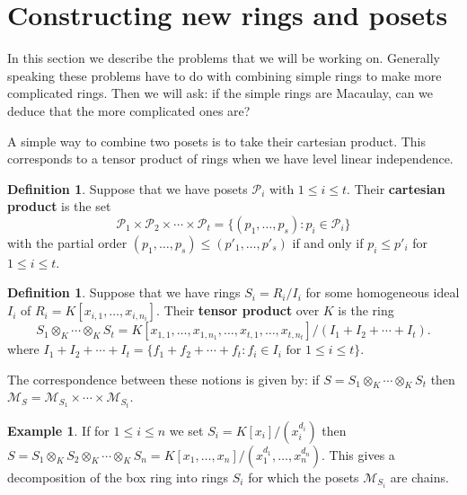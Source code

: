 \documentclass[11pt]{amsart}
\newcommand{\M}{{\mathcal M}}
\renewcommand{\P}{{\mathcal P}}
\theoremstyle{plain} %
\theoremstyle{definition}
\newtheorem{defn}[thm]{Definition}
\newtheorem{ex}[thm]{Example}
\theoremstyle{remark}
\numberwithin{equation}{section}  %
\begin{document}
\section{Constructing new rings and posets}\label{s:3}
 In this section we describe the problems that we will be working on. Generally speaking these problems have to do with combining simple rings to make more complicated rings. Then we will ask: if the simple rings are Macaulay, can we deduce that the more complicated ones are?

A simple way to combine two posets is to take their cartesian product. This corresponds to a tensor product of rings when we have level linear independence.
\begin{tcolorbox}
\begin{defn}
Suppose that we have posets $\P_i$ with $1\leq i\leq t$. Their {\bf cartesian product} is the set
\[
\P_1\times \P_2 \times \cdots  \times \P_t=\{(p_1,\ldots, p_s): p_i\in \P_i\}
\]
with the partial order $(p_1,\ldots, p_s)\leq (p'_1,\ldots, p'_s)$ if and only if $p_i\leq p'_i$ for $1\leq i\leq t$.
\end{defn}
\end{tcolorbox}

\begin{tcolorbox}
\begin{defn}
Suppose that we have rings $S_i = R_i/I_i$ for some homogeneous ideal $I_i$ of $R_i = K[x_{i,1}, \ldots, x_{i,n_i} ]$. Their  {\bf tensor product} over $K$ is the ring
\[
S_1\otimes_K \cdots \otimes_K S_t = K[x_{1,1},\ldots,x_{1,n_1},\ldots,x_{t,1},\ldots,x_{t,n_t}]/ (I_1 +I_2 +\cdots +I_t).
\]
where $I_1 +I_2 +\cdots +I_t=\{f_1+f_2+\cdots+f_t: f_i\in I_i \text{ for } 1\leq i\leq t\}$.
\end{defn}
\end{tcolorbox}
The correspondence between these notions is given by: if $S=S_1\otimes_K \cdots \otimes_K S_t $ then $\M_S=\M_{S_1}\times \cdots \times \M_{S_t}$. 

\begin{ex}\label{ex: tensor product}
If for $1\leq i\leq n$ we set $S_i=K[x_i]/(x_i^{d_i})$ then $S=S_1\otimes_K S_2\otimes_K \cdots \otimes_K S_n=K[x_1,\ldots, x_n]/(x_1^{d_1},\ldots, x_n^{d_n})$. This gives a decomposition of the box ring into rings $S_i$ for which the posets $\M_{S_i}$ are chains.
\end{ex}
\end{document}
